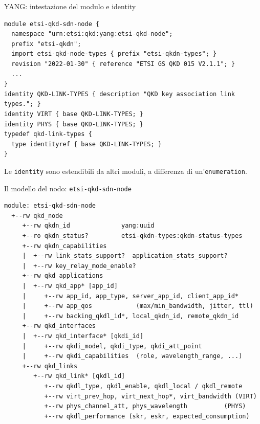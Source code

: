 \documentclass[10pt]{beamer}
\begin{document}
\begin{frame}[fragile]{YANG: intestazione del modulo e identity}
\begin{lstlisting}[language=yang]
module etsi-qkd-sdn-node {
  namespace "urn:etsi:qkd:yang:etsi-qkd-node";
  prefix "etsi-qkdn";
  import etsi-qkd-node-types { prefix "etsi-qkdn-types"; }
  revision "2022-01-30" { reference "ETSI GS QKD 015 V2.1.1"; }
  ...
}
identity QKD-LINK-TYPES { description "QKD key association link types."; }
identity VIRT { base QKD-LINK-TYPES; }
identity PHYS { base QKD-LINK-TYPES; }
typedef qkd-link-types {
  type identityref { base QKD-LINK-TYPES; }
}
\end{lstlisting}
  \footnotesize Le \texttt{identity} sono estendibili da altri moduli,
      a differenza di un'\texttt{enumeration}.
\end{frame}

\begin{frame}[fragile]{Il modello del nodo: \texttt{etsi-qkd-sdn-node}}
\begin{lstlisting}[basicstyle=\ttfamily\fontsize{6.8}{7.4}\selectfont]
module: etsi-qkd-sdn-node
  +--rw qkd_node
     +--rw qkdn_id              yang:uuid
     +--ro qkdn_status?         etsi-qkdn-types:qkdn-status-types
     +--rw qkdn_capabilities
     |  +--rw link_stats_support?  application_stats_support?
     |  +--rw key_relay_mode_enable?
     +--rw qkd_applications
     |  +--rw qkd_app* [app_id]
     |     +--rw app_id, app_type, server_app_id, client_app_id*
     |     +--rw app_qos            (max/min_bandwidth, jitter, ttl)
     |     +--rw backing_qkdl_id*, local_qkdn_id, remote_qkdn_id
     +--rw qkd_interfaces
     |  +--rw qkd_interface* [qkdi_id]
     |     +--rw qkdi_model, qkdi_type, qkdi_att_point
     |     +--rw qkdi_capabilities  (role, wavelength_range, ...)
     +--rw qkd_links
        +--rw qkd_link* [qkdl_id]
           +--rw qkdl_type, qkdl_enable, qkdl_local / qkdl_remote
           +--rw virt_prev_hop, virt_next_hop*, virt_bandwidth (VIRT)
           +--rw phys_channel_att, phys_wavelength          (PHYS)
           +--rw qkdl_performance (skr, eskr, expected_consumption)
\end{lstlisting}
\end{frame}
\end{document}
